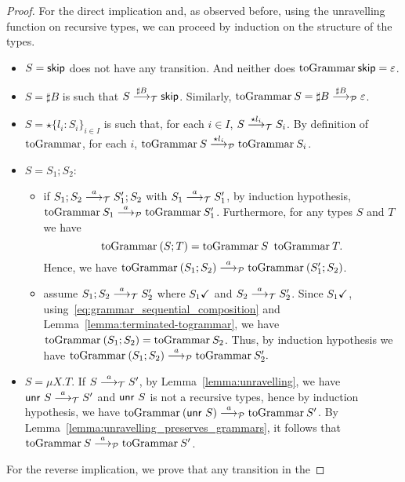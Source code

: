 \begin{proof}
	For the direct implication and, as observed before, 
	using the unravelling
	function on recursive types, we can proceed by induction
	on the structure of the types.
	
	\begin{itemize}
		\item $S=\skipk$ does not have any transition. And
		neither does $\toGrammarf{\skipk} = \varepsilon$.
		\item $S=\sharp B$ is such that $S \LTSderives[\sharp B] \skipk$.
		Similarly, $\toGrammarf{S} = \sharp B \LTSderivesP[\sharp B] \varepsilon$.
		\item $S=\star\{l_i\colon S_i\}_{i\in I}$ is such that, for each $i\in I$,
		$S \LTSderives[\star l_i] S_i$. By definition of $\toGrammark$, for each $i$, 
		$\toGrammarf{S} \LTSderivesP[\star l_i] \toGrammarf{S_i}$.
		\item $S=S_1;S_2$:
		\begin{itemize}
			\item if $S_1;S_2\LTSderives S_1';S_2$ with $S_1\LTSderives S_1'$,
			by induction hypothesis, $\toGrammarf{ S_1} \LTSderivesP \toGrammarf{S_1'}$.
			Furthermore, for any types $S$ and $T$ we have
			\begin{equation}
			\label{eq:grammar_sequential_composition}
				\toGrammarf{(S;T)} = \toGrammarf{S}\enspace\toGrammarf{T}.	
			\end{equation}
			Hence, we have $\toGrammarf{(S_1;S_2)} \LTSderivesP \toGrammarf{(S_1';S_2)}$.
			\item assume $S_1;S_2\LTSderives S_2'$ where 
				$\DONE{S_1}$ and
				$S_2\LTSderives S_2'$.
			Since $\DONE{S_1}$, 
			using~\eqref{eq:grammar_sequential_composition} and
			Lemma~\ref{lemma:terminated-togrammar}, 
			we have $\toGrammarf{(S_1;S_2)} = \toGrammarf{S_2}$.
			Thus, by induction hypothesis we have 
			$\toGrammarf{(S_1;S_2)} \LTSderivesP \toGrammarf{S_2'}.$
		\end{itemize}
		\item $S=\mu X.T$. If $S\LTSderives S'$, by Lemma~\ref{lemma:unravelling},
		we have $\Unravel\ S \LTSderives S'$ and $\Unravel\ S$ is not a recursive
		types, hence by induction hypothesis, we have
		$\toGrammarf{(\Unravel\ S)}\LTSderivesP \toGrammarf{S'}$.
		By Lemma~\ref{lemma:unravelling_preserves_grammars},
		it follows that
		$\toGrammarf{S}\LTSderivesP \toGrammarf{S'}$.\smallskip
	\end{itemize}
	For the reverse implication, we prove that any transition in the

\end{proof}
